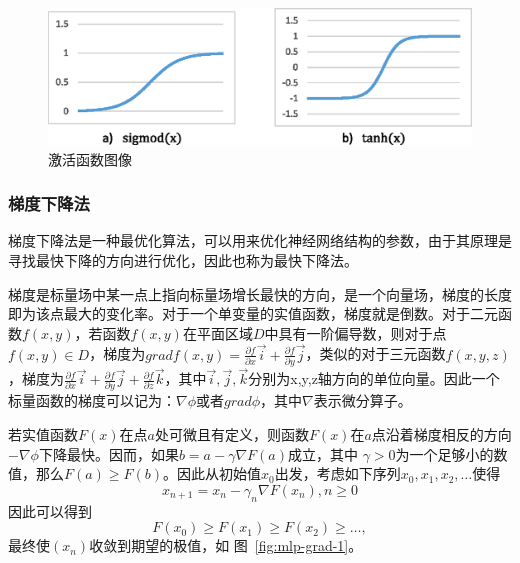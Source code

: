 \documentclass[bachelor,zhspacing]{cqu}  %
\begin{document}
\begin{figure}[htbp]
\centering
\includegraphics{./pic/tanh-sigmod.eps}
\caption{激活函数图像}\label{fig:mlp-act}
\end{figure}

\subsubsection{梯度下降法}\label{ux68afux5ea6ux4e0bux964dux6cd5}

梯度下降法是一种最优化算法，可以用来优化神经网络结构的参数，由于其原理是寻找最快下降的方向进行优化，因此也称为最快下降法。

梯度是标量场中某一点上指向标量场增长最快的方向，是一个向量场，梯度的长度即为该点最大的变化率。对于一个单变量的实值函数，梯度就是倒数。对于二元函数\(f(x,y)\)，若函数\(f(x,y)\)在平面区域\(D\)中具有一阶偏导数，则对于点\(f(x,y)\in D\)，梯度为\(gradf(x,y) = \frac{\partial f}{\partial x}\vec{i} + \frac{\partial f}{\partial y}\vec{j}\)，类似的对于三元函数\(f(x,y,z)\)，梯度为\(\frac{\partial f }{\partial x }\vec{i} + \frac{\partial f }{\partial y }\vec{j} + \frac{\partial f }{\partial z }\vec{k}\)，其中\(\vec{i},\vec{j},\vec{k}\)分别为x,y,z轴方向的单位向量。因此一个标量函数的梯度可以记为：\(\nabla{\phi}\)或者\(grad\phi\)，其中\(\nabla\)表示微分算子。

若实值函数\(F(x)\)在点\(a\)处可微且有定义，则函数\(F(x)\)在\(a\)点沿着梯度相反的方向\(-\nabla{\phi}\)下降最快。因而，如果\(b = a - \gamma \nabla F(a)\)成立，其中
\(\gamma > 0\)为一个足够小的数值，那么\(F(a)\ge F(b)\)。因此从初始值\(x_{0}\)出发，考虑如下序列\(x_{0},x_{1},x_{2},\ldots\)使得
\[x_{n+1} = x_{n} - \gamma_{n}\nabla F(x_{n}),n\ge 0\] 因此可以得到
\[F(x_{0})\ge F(x_{1})\ge F(x_{2})\ge\ldots,\]
最终使\((x_{n})\)收敛到期望的极值，如 图~\ref{fig:mlp-grad-1}。
\end{document}
